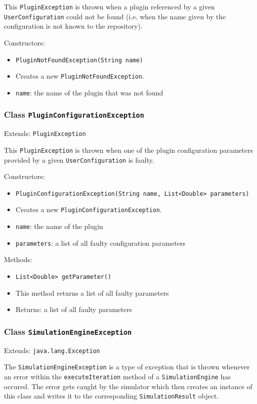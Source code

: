 \documentclass[parskip=full,11pt]{scrartcl}
\begin{document}
This \texttt{PluginException} is thrown when a plugin referenced by a given \texttt{UserConfiguration} could not be found (i.e. when the name given by the configuration is not known to the repository).

Constructors:
\begin{itemize} \itemsep -10pt
	\item \texttt{PluginNotFoundException(String name)}
	\item[] Creates a new \texttt{PluginNotFoundException}.
	\item[] \texttt{name}: the name of the plugin that was not found
\end{itemize}

\subsubsection{Class \texttt{PluginConfigurationException}}
Extends: \texttt{PluginException}

This \texttt{PluginException} is thrown when one of the plugin configuration parameters provided by a given \texttt{UserConfiguration} is faulty.

Constructors:
\begin{itemize}\itemsep -10pt
	\item \texttt{PluginConfigurationException(String name, List<Double> parameters)}
	\item[] Creates a new \texttt{PluginConfigurationException}.
	\item[] \texttt{name}: the name of the plugin
	\item[] \texttt{parameters}: a list of all faulty configuration parameters
\end{itemize}

Methods:
\begin{itemize}\itemsep -10pt
	\item \texttt{List<Double> getParameter()}
	\item[] This method returns a list of all faulty parameters
	\item[] Returns: a list of all faulty parameters
\end{itemize}

\subsubsection{Class \texttt{SimulationEngineException}}
Extends: \texttt{java.lang.Exception}

The \texttt{SimulationEngineException} is a type of exception that is thrown whenever an error within the \texttt{executeIteration} method of a \texttt{SimulationEngine} has occured. The error gets caught by the simulator which then creates an instance of this class and writes it to the corresponding \texttt{SimulationResult} object.
\end{document}
